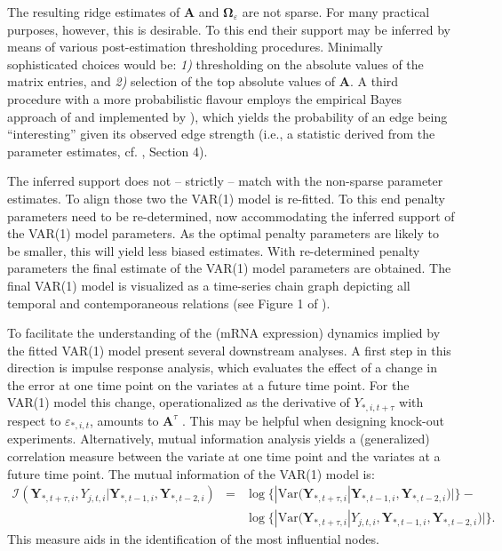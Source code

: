 The resulting ridge estimates of $\mathbf{A}$ and $\mathbf{\Omega}_{\varepsilon}$ are not sparse. For many practical purposes, however, this is desirable. To this end their support may be inferred  by means of various  post-estimation thresholding procedures. Minimally sophisticated choices would be: \textit{1)} thresholding on the absolute values of the matrix entries, and \textit{2)} selection of the top absolute values of $\mathbf{A}$. A third procedure with a more probabilistic flavour employs the empirical Bayes approach of \cite{Efron2004} and implemented by \cite{Strimmer2008}), which yields the probability of an edge being ``interesting'' given its observed edge strength (i.e., a statistic derived from the parameter estimates, cf. \cite{Miok2017}, Section 4).
 
The inferred support does not -- strictly -- match with the non-sparse parameter estimates. To align those two the VAR(1) model is re-fitted. To this end penalty parameters need to be re-determined, now accommodating the inferred support of the VAR(1) model parameters. As the optimal penalty parameters are likely to be smaller, this will yield less biased estimates. With re-determined penalty parameters the final estimate of the VAR(1) model parameters are obtained. The final VAR(1) model is visualized as a time-series chain graph depicting all temporal and contemporaneous relations (see Figure 1 of \cite{Miok2017}).

To facilitate the understanding of the (mRNA expression) dynamics implied by the fitted VAR(1) model \citep{Miok2017} present several downstream analyses. A first step in this direction is impulse response analysis, which evaluates the effect of a change in the error at one time point on the variates at a future time point. For the VAR(1) model this change, operationalized as the derivative of $Y_{*, i, t+\tau}$ with respect to $\varepsilon_{*, i, t}$, amounts to $\mathbf{A}^{\tau}$ \citep{Hamilton1994}. This may be helpful when designing knock-out experiments. Alternatively, mutual information analysis yields a (generalized) correlation measure between the variate at one time point and the variates at a future time point. The mutual information of the VAR(1) model is:
\begin{eqnarray*}
\mathcal{I}(\mathbf{Y}_{*,t+\tau,i},Y_{j,t,i}|\mathbf{Y}_{*,t-1,i},\mathbf{Y}_{*,t-2,i}) & = & \log \{ |\mbox{Var}(\mathbf{Y}_{*,t+\tau,i}|\mathbf{Y}_{*,t-1,i},\mathbf{Y}_{*,t-2,i}) | \}-  
\\
& & \log \{ | \mbox{Var}(\mathbf{Y}_{*,t+\tau,i}|Y_{j,t,i},\mathbf{Y}_{*,t-1,i},\mathbf{Y}_{*,t-2,i}) | \}.
\end{eqnarray*}
This measure aids in the identification of the most influential nodes.



